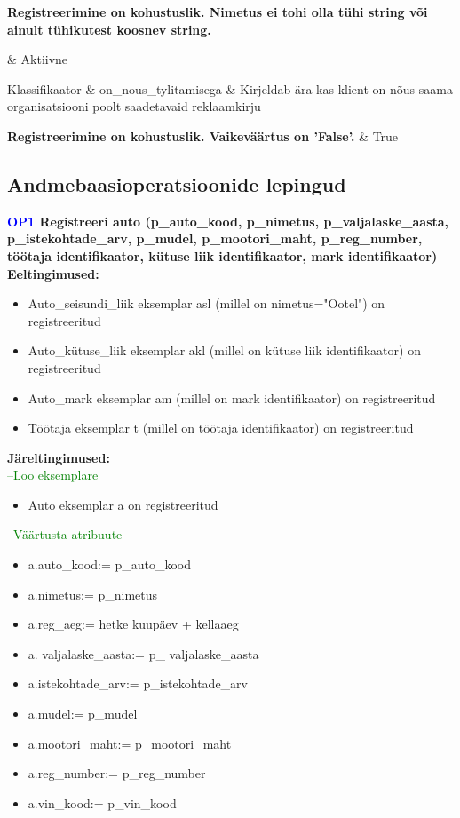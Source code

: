 \begin{longtabu}
	\textbf{Registreerimine on kohustuslik. Nimetus ei tohi olla tühi string või
	ainult tühikutest koosnev string.}
	
	& Aktiivne\\ \hline
	
	Klassifikaator
	& on\_nous\_tylitamisega
	& Kirjeldab ära kas klient on nõus saama organisatsiooni poolt saadetavaid reklaamkirju 
	
	\textbf{Registreerimine on kohustuslik. Vaikeväärtus on 'False'.}
	& True\\ \hline
	\end{longtabu}

\subsection{Andmebaasioperatsioonide lepingud}
\textbf{\textcolor{blue}{OP1} Registreeri auto (p\_auto\_kood, p\_nimetus, p\_valjalaske\_aasta, p\_istekohtade\_arv, p\_mudel, p\_mootori\_maht, p\_reg\_number, töötaja identifikaator, kütuse liik identifikaator, mark identifikaator)} \\
\textbf{Eeltingimused:}
\begin{itemize}
	\item Auto\_seisundi\_liik eksemplar asl (millel on nimetus="Ootel") on registreeritud
	\item Auto\_kütuse\_liik eksemplar akl (millel on kütuse liik identifikaator) on registreeritud
	\item Auto\_mark eksemplar am (millel on mark identifikaator) on registreeritud
	\item Töötaja eksemplar t (millel on töötaja identifikaator) on registreeritud
\end{itemize}
\textbf{Järeltingimused:} \\
\textcolor{green}{--Loo eksemplare}
\begin{itemize}
	\item Auto eksemplar a on registreeritud
\end{itemize}
\textcolor{green}{--Väärtusta atribuute}
\begin{itemize}
	\item a.auto\_kood:= p\_auto\_kood
	\item a.nimetus:= p\_nimetus
	\item a.reg\_aeg:= hetke kuupäev + kellaaeg
	\item a. valjalaske\_aasta:= p\_ valjalaske\_aasta
	\item a.istekohtade\_arv:= p\_istekohtade\_arv
	\item a.mudel:= p\_mudel
	\item a.mootori\_maht:= p\_mootori\_maht
	\item a.reg\_number:= p\_reg\_number
	\item a.vin\_kood:= p\_vin\_kood
\end{itemize}
